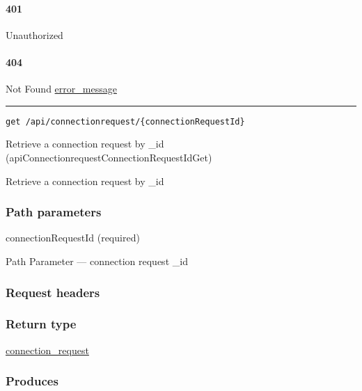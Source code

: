 \hypertarget{section-172}{%
\paragraph{401}\label{section-172}}

Unauthorized \protect\hyperlink{}{}

\hypertarget{section-173}{%
\paragraph{404}\label{section-173}}

Not Found \protect\hyperlink{error_message}{error\_message}

\begin{center}\rule{0.5\linewidth}{\linethickness}\end{center}

\protect\hypertarget{apiConnectionrequestConnectionRequestIdGet}{}{}

\begin{verbatim}
get /api/connectionrequest/{connectionRequestId}
\end{verbatim}

Retrieve a connection request by \_id
({apiConnectionrequestConnectionRequestIdGet})

Retrieve a connection request by \_id

\hypertarget{path-parameters-28}{%
\subsubsection{Path parameters}\label{path-parameters-28}}

connectionRequestId (required)

{Path Parameter} --- connection request \_id

\hypertarget{request-headers-29}{%
\subsubsection{Request headers}\label{request-headers-29}}

\hypertarget{return-type-42}{%
\subsubsection{Return type}\label{return-type-42}}

\protect\hyperlink{connection_request}{connection\_request}

\hypertarget{produces-53}{%
\subsubsection{Produces}\label{produces-53}}

